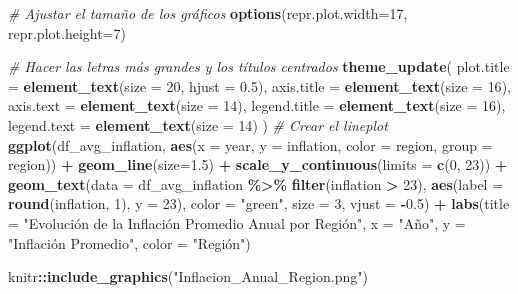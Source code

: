 \documentclass[
]{article}
\newenvironment{Shaded}{\begin{snugshade}}{\end{snugshade}}
\newcommand{\AttributeTok}[1]{\textcolor[rgb]{0.13,0.29,0.53}{#1}}
\newcommand{\CommentTok}[1]{\textcolor[rgb]{0.56,0.35,0.01}{\textit{#1}}}
\newcommand{\DecValTok}[1]{\textcolor[rgb]{0.00,0.00,0.81}{#1}}
\newcommand{\FloatTok}[1]{\textcolor[rgb]{0.00,0.00,0.81}{#1}}
\newcommand{\FunctionTok}[1]{\textcolor[rgb]{0.13,0.29,0.53}{\textbf{#1}}}
\newcommand{\NormalTok}[1]{#1}
\newcommand{\SpecialCharTok}[1]{\textcolor[rgb]{0.81,0.36,0.00}{\textbf{#1}}}
\newcommand{\StringTok}[1]{\textcolor[rgb]{0.31,0.60,0.02}{#1}}
\begin{document}
\begin{Shaded}
\begin{Highlighting}[]
\CommentTok{\# Ajustar el tamaño de los gráficos}
\FunctionTok{options}\NormalTok{(}\AttributeTok{repr.plot.width=}\DecValTok{17}\NormalTok{, }\AttributeTok{repr.plot.height=}\DecValTok{7}\NormalTok{)}

\CommentTok{\# Hacer las letras más grandes y los títulos centrados}
\FunctionTok{theme\_update}\NormalTok{(}
    \AttributeTok{plot.title =} \FunctionTok{element\_text}\NormalTok{(}\AttributeTok{size =} \DecValTok{20}\NormalTok{, }\AttributeTok{hjust =} \FloatTok{0.5}\NormalTok{),}
    \AttributeTok{axis.title =} \FunctionTok{element\_text}\NormalTok{(}\AttributeTok{size =} \DecValTok{16}\NormalTok{),}
    \AttributeTok{axis.text =} \FunctionTok{element\_text}\NormalTok{(}\AttributeTok{size =} \DecValTok{14}\NormalTok{),}
    \AttributeTok{legend.title =} \FunctionTok{element\_text}\NormalTok{(}\AttributeTok{size =} \DecValTok{16}\NormalTok{),}
    \AttributeTok{legend.text =} \FunctionTok{element\_text}\NormalTok{(}\AttributeTok{size =} \DecValTok{14}\NormalTok{)}
\NormalTok{)}
\CommentTok{\# Crear el lineplot}
\FunctionTok{ggplot}\NormalTok{(df\_avg\_inflation, }\FunctionTok{aes}\NormalTok{(}\AttributeTok{x =}\NormalTok{ year, }\AttributeTok{y =}\NormalTok{ inflation, }\AttributeTok{color =}\NormalTok{ region, }\AttributeTok{group =}\NormalTok{ region)) }\SpecialCharTok{+}
    \FunctionTok{geom\_line}\NormalTok{(}\AttributeTok{size=}\FloatTok{1.5}\NormalTok{) }\SpecialCharTok{+}
    \FunctionTok{scale\_y\_continuous}\NormalTok{(}\AttributeTok{limits =} \FunctionTok{c}\NormalTok{(}\DecValTok{0}\NormalTok{, }\DecValTok{23}\NormalTok{)) }\SpecialCharTok{+}
    \FunctionTok{geom\_text}\NormalTok{(}\AttributeTok{data =}\NormalTok{ df\_avg\_inflation }\SpecialCharTok{\%\textgreater{}\%} \FunctionTok{filter}\NormalTok{(inflation }\SpecialCharTok{\textgreater{}} \DecValTok{23}\NormalTok{),}
              \FunctionTok{aes}\NormalTok{(}\AttributeTok{label =} \FunctionTok{round}\NormalTok{(inflation, }\DecValTok{1}\NormalTok{), }\AttributeTok{y =} \DecValTok{23}\NormalTok{),}
              \AttributeTok{color =} \StringTok{"green"}\NormalTok{, }\AttributeTok{size =} \DecValTok{3}\NormalTok{, }\AttributeTok{vjust =} \SpecialCharTok{{-}}\FloatTok{0.5}\NormalTok{) }\SpecialCharTok{+}
    \FunctionTok{labs}\NormalTok{(}\AttributeTok{title =} \StringTok{"Evolución de la Inflación Promedio Anual por Región"}\NormalTok{,}
         \AttributeTok{x =} \StringTok{"Año"}\NormalTok{,}
         \AttributeTok{y =} \StringTok{"Inflación Promedio"}\NormalTok{,}
         \AttributeTok{color =} \StringTok{"Región"}\NormalTok{)}

\NormalTok{knitr}\SpecialCharTok{::}\FunctionTok{include\_graphics}\NormalTok{(}\StringTok{"Inflacion\_Anual\_Region.png"}\NormalTok{)}
\end{Highlighting}
\end{Shaded}
\end{document}
